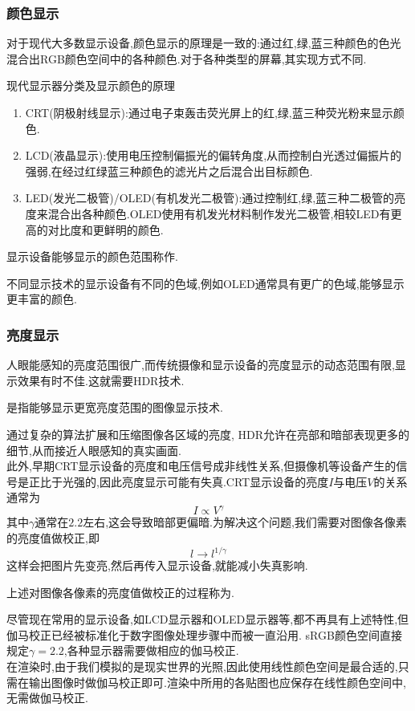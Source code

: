 \documentclass{ctexart}
\begin{document}
\subsubsection{颜色显示}
对于现代大多数显示设备,颜色显示的原理是一致的:通过红,绿,蓝三种颜色的色光混合出RGB颜色空间中的各种颜色.对于各种类型的屏幕,其实现方式不同.
\begin{other}[分类]{现代显示器分类及显示颜色的原理}
    \begin{enumerate}[label=\arabic*.,topsep=0pt,parsep=0pt,itemsep=0pt,partopsep=0pt]
        \item CRT(阴极射线显示):通过电子束轰击荧光屏上的红,绿,蓝三种荧光粉来显示颜色.
        \item LCD(液晶显示):使用电压控制偏振光的偏转角度,从而控制白光透过偏振片的强弱,在经过红绿蓝三种颜色的滤光片之后混合出目标颜色.
        \item LED(发光二极管)/OLED(有机发光二极管):通过控制红,绿,蓝三种二极管的亮度来混合出各种颜色.OLED使用有机发光材料制作发光二极管,相较LED有更高的对比度和更鲜明的颜色.
    \end{enumerate}
\end{other}
\begin{definition}[色域]
    显示设备能够显示的颜色范围称作.
\end{definition}
不同显示技术的显示设备有不同的色域,例如OLED通常具有更广的色域,能够显示更丰富的颜色.
\subsubsection{亮度显示}
人眼能感知的亮度范围很广,而传统摄像和显示设备的亮度显示的动态范围有限,显示效果有时不佳.这就需要HDR技术.
\begin{definition}[高动态范围显示]
    是指能够显示更宽亮度范围的图像显示技术.
\end{definition}
通过复杂的算法扩展和压缩图像各区域的亮度, HDR允许在亮部和暗部表现更多的细节,从而接近人眼感知的真实画面.\\
\indent 此外,早期CRT显示设备的亮度和电压信号成非线性关系,但摄像机等设备产生的信号是正比于光强的,因此亮度显示可能有失真.CRT显示设备的亮度$I$与电压$V$的关系通常为
\[I\propto V^\gamma\]
其中$\gamma$通常在$2.2$左右,这会导致暗部更偏暗.为解决这个问题,我们需要对图像各像素的亮度值做校正,即
\[l\to l^{1/\gamma}\]
这样会把图片先变亮,然后再传入显示设备,就能减小失真影响.
\begin{definition}[伽马校正]
    上述对图像各像素的亮度值做校正的过程称为.
\end{definition}
尽管现在常用的显示设备,如LCD显示器和OLED显示器等,都不再具有上述特性,但伽马校正已经被标准化于数字图像处理步骤中而被一直沿用. sRGB颜色空间直接规定$\gamma=2.2$,各种显示器需要做相应的伽马校正.\\
\indent 在渲染时,由于我们模拟的是现实世界的光照,因此使用线性颜色空间是最合适的,只需在输出图像时做伽马校正即可.渲染中所用的各贴图也应保存在线性颜色空间中,无需做伽马校正.
\end{document}
